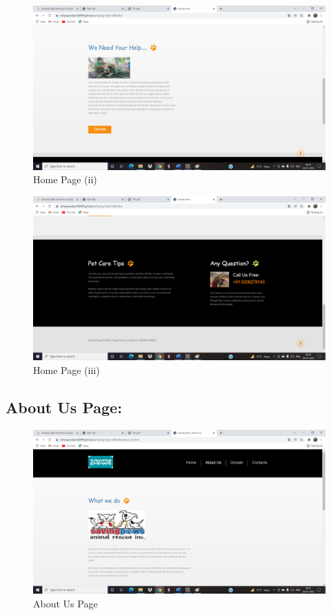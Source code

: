 \documentclass[12pt]{article}
\begin{document}
\begin{figure}[h]
\centering
\includegraphics[scale=0.23]{Untitled.png}
\caption{Home Page (ii)}
\label{Untitled.png}
\end{figure}
\clearpage

\begin{figure}[h]
\centering
\includegraphics[scale=0.26]{Untitled2.png}
\caption{Home Page (iii)}
\label{Untitled2.png}
\end{figure}


\subsection{About Us Page:}
\begin{figure}[h]
\centering
\includegraphics[scale=0.26]{Untitled3.png}
\caption{About Us Page}
\label{Untitled3.png}
\end{figure}
\clearpage
\end{document}
